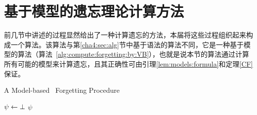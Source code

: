 %	
%	
%	


\section{基于模型的遗忘理论计算方法}\label{chapter06:sec:algm}
前几节中讲述的过程显然给出了一种计算遗忘的方法，本届将这些过程组织起来构成一个算法。该算法与第\ref{cha4:sec:alg}节中基于语法的算法不同，它是一种基于模型的算法（算法~\ref{alg:compute:forgetting:by:VB}），也就是说本节的算法通过计算所有可能的模型来计算遗忘，且其正确性可由引理\ref{lem:models:formula}和定理\ref{CF}保证。


\begin{algorithm}[tb]
	\caption{\small A Model-based \CTL\ Forgetting Procedure}
	\label{alg:compute:forgetting:by:VB}
	\LinesNumbered
	$\psi \leftarrow \bot$\;
	\Return $\psi$\;
\end{algorithm}



